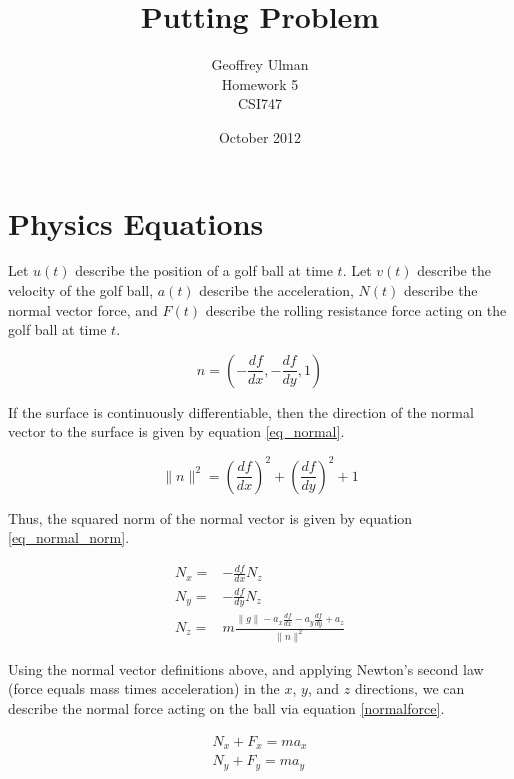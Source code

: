 \documentclass{article}
\begin{document}
\title{Putting Problem}
\author{Geoffrey Ulman\\
        Homework 5\\
        CSI747}
\date{October 2012}
\maketitle

\section{Physics Equations}\label{Physics Equations}

Let \(u(t)\) describe the position of a golf ball at time \(t\). Let \(v(t)\) describe the velocity of the golf ball, \(a(t)\) describe the acceleration, \(N(t)\) describe the normal vector force, and \(F(t)\) describe the rolling resistance force acting on the golf ball at time \(t\).

\begin{equation}\label{eq_normal}
n = \left( -\frac{df}{dx},-\frac{df}{dy}, 1 \right)
\end{equation}

If the surface is continuously differentiable, then the direction of the normal vector to the surface is given by equation \ref{eq_normal}.

\begin{equation}\label{eq_normal_norm}
\|n\|^2 = \left( \frac{df}{dx} \right)^2 + \left( \frac{df}{dy} \right)^2 + 1
\end{equation}

Thus, the squared norm of the normal vector is given by equation \ref{eq_normal_norm}.

\begin{eqnarray}\label{normalforce}
N_x = &- \frac{df}{dx} N_z \nonumber \\
N_y = &- \frac{df}{dy} N_z \nonumber \\
N_z = &m \frac{  \|g\| - a_x \frac{df}{dx} - a_y \frac{df}{dy}  +a_z  }{\|n\|^2}
\end{eqnarray}

Using the normal vector definitions above, and applying Newton's second law (force equals mass times acceleration) in the \(x\), \(y\), and \(z\) directions, we can describe the normal force acting on the ball via equation \ref{normalforce}.

\begin{eqnarray}\label{eq1}
N_x + F_x = ma_x \nonumber \\
N_y + F_y = ma_y
\end{eqnarray}
\end{document}
